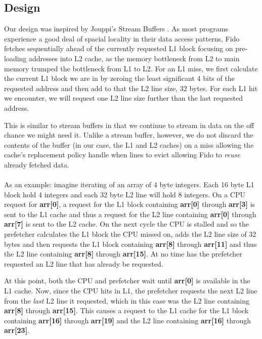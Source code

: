 \documentclass[11pt]{article}
\begin{document}
\subsection{Design}
Our design was inspired by Jouppi's Stream Buffers \cite{JouppiStreamBuff}. As most programs experience a good deal of spacial locality in their data access patterns, Fido fetches sequentially ahead of the currently requested L1 block focusing on pre-loading addresses into L2 cache, as the memory bottleneck from L2 to main memory trumped the bottleneck from L1 to L2. For an L1 miss, we first calculate the current L1 block we are in by zeroing the least significant 4 bits of the requested address and then add to that the L2 line size, 32 bytes. For each L1 hit we encounter, we will request one L2 line size further than the last requested address. 

This is similar to stream buffers in that we continue to stream in data on the off chance we might need it. Unlike a stream buffer, however, we do not discard the contents of the buffer (in our case, the L1 and L2 caches) on a miss allowing the cache's replacement policy handle when lines to evict allowing Fido to \textit{reuse} already fetched data. 
\\
\\
As an example: imagine iterating of an array of 4 byte integers. Each 16 byte L1 block hold 4 integers and each 32 byte L2 line will hold 8 integers. On a CPU request for \textbf{arr[0]}, a request for the L1 block containing \textbf{arr[0]} through \textbf{arr[3]} is sent to the L1 cache and thus a request for the L2 line containing \textbf{arr[0]} through \textbf{arr[7]} is sent to the L2 cache. On the next cycle the CPU is stalled and so the prefetcher calculates the L1 block the CPU missed on, adds the L2 line size of 32 bytes and then requests the L1 block containing \textbf{arr[8]} through \textbf{arr[11]} and thus the L2 line containing \textbf{arr[8]} through \textbf{arr[15]}. At no time has the prefetcher requested an L2 line that has already be requested. 

At this point, both the CPU and prefetcher wait until \textbf{arr[0]} is available in the L1 cache. Now, since the CPU hits in L1, the prefetcher requests the next L2 line from the \textit{last} L2 line it requested, which in this case was the L2 line containing \textbf{arr[8]} through \textbf{arr[15]}. This causes a request to the L1 cache for the L1 block containing \textbf{arr[16]} through \textbf{arr[19]} and the L2 line containing \textbf{arr[16]} through \textbf{arr[23]}. 
\end{document}
